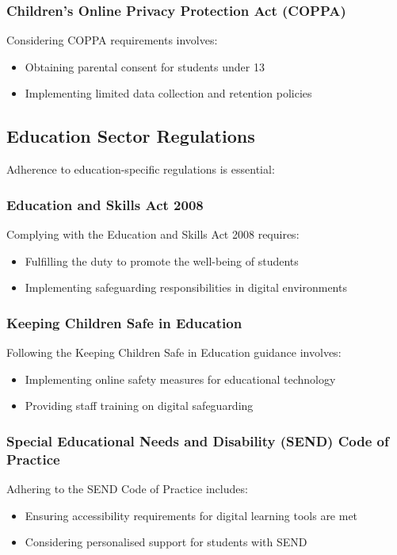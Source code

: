 \documentclass[15pt,a4paper]{article}
\begin{document}
\begin{multicols}{2}
\subsubsection*{Children's Online Privacy Protection Act (COPPA)}
Considering COPPA requirements \textit{\parencite{FTC2023}} involves:
\begin{itemize}
    \item Obtaining parental consent for students under 13
    \item Implementing limited data collection and retention policies
\end{itemize}

\subsection{Education Sector Regulations}
Adherence to education-specific regulations is essential:

\subsubsection*{Education and Skills Act 2008}
Complying with the Education and Skills Act 2008 \textit{\parencite{UKGov2008}} requires:
\begin{itemize}
    \item Fulfilling the duty to promote the well-being of students
    \item Implementing safeguarding responsibilities in digital environments
\end{itemize}

\subsubsection*{Keeping Children Safe in Education}
Following the Keeping Children Safe in Education guidance \textit{\parencite{DfE2024a}} involves:
\begin{itemize}
    \item Implementing online safety measures for educational technology
    \item Providing staff training on digital safeguarding
\end{itemize}

\subsubsection*{Special Educational Needs and Disability (SEND) Code of Practice}
Adhering to the SEND Code of Practice \textit{\parencite{DfE2024b}} includes:
\begin{itemize}
    \item Ensuring accessibility requirements for digital learning tools are met
    \item Considering personalised support for students with SEND
\end{itemize}


\end{multicols}
\end{document}
